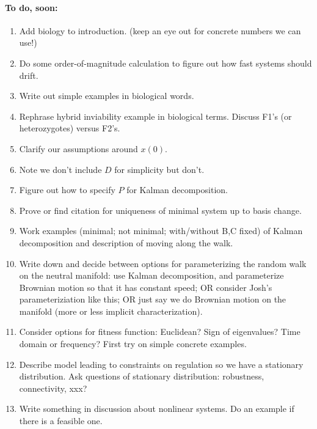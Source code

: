 \documentclass[11 pt]{article}
\begin{document}
\paragraph{To do, soon:}

\begin{enumerate}
    \item Add biology to introduction. (keep an eye out for concrete numbers we can use!)

    \item Do some order-of-magnitude calculation to figure out how fast systems should drift.

    \item Write out simple examples in biological words.

    \item Rephrase hybrid inviability example in biological terms.  Discuss F1's (or heterozygotes) versus F2's.

    \item Clarify our assumptions around $x(0)$. 

    \item Note we don't include $D$ for simplicity but don't.

    \item Figure out how to specify $P$ for Kalman decomposition.

    \item Prove or find citation for uniqueness of minimal system up to basis change.

    \item Work examples (minimal; not minimal; with/without B,C fixed) of Kalman decomposition and description of moving along the walk.

    \item Write down and decide between options for parameterizing the random walk on the neutral manifold:
        use Kalman decomposition, and parameterize Brownian motion so that it has constant speed;
        OR consider Josh's parameteriziation like this;
        OR just say we do Brownian motion on the manifold (more or less implicit characterization).

    \item Consider options for fitness function: Euclidean? Sign of eigenvalues?  Time domain or frequency?
        First try on simple concrete examples.

    \item Describe model leading to constraints on regulation so we have a stationary distribution.
        Ask questions of stationary distribution: robustness, connectivity, xxx?

    \item Write something in discussion about nonlinear systems.  Do an example if there is a feasible one.

\end{enumerate}
\end{document}
